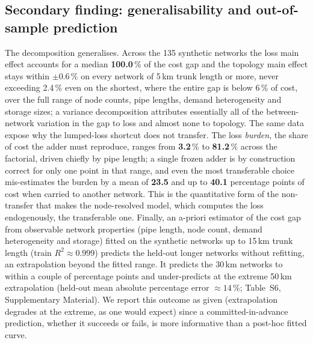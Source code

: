 \documentclass[a4paper,fleqn]{cas-sc}
\begin{document}
\subsection{Secondary finding: generalisability and out-of-sample prediction}
\label{subsec:generalis}
The decomposition generalises. Across the 135 synthetic networks the loss main effect
accounts for a median \textbf{100.0}\,\% of the cost gap and the topology main
effect stays within $\pm$0.6\,\% on every network of 5\,km trunk length or more, never exceeding 2.4\,\% even on the shortest, where the entire gap is below 6\,\% of cost, over the full range of
node counts, pipe lengths, demand heterogeneity and storage sizes; a variance decomposition
attributes essentially all of the between-network variation in the gap to loss and almost none
to topology. The same data expose why the lumped-loss shortcut does not transfer. The loss
\emph{burden}, the share of cost the adder must reproduce, ranges from
\textbf{3.2}\,\% to \textbf{81.2}\,\% across the factorial, driven
chiefly by pipe length; a single frozen adder is by construction correct for only one point in
that range, and even the most transferable choice mis-estimates the burden by a mean of
\textbf{23.5} and up to \textbf{40.1} percentage points of cost
when carried to another network. This is the quantitative form of the non-transfer that makes
the node-resolved model, which computes the loss endogenously, the transferable one. Finally,
an a-priori estimator of the cost gap from observable network properties (pipe length, node
count, demand heterogeneity and storage) fitted on the synthetic networks up to 15\,km trunk
length (train $R^2\approx0.999$) predicts the held-out longer networks without refitting, an
extrapolation beyond the fitted range. It predicts the 30\,km networks to within a couple of
percentage points and under-predicts at the extreme 50\,km extrapolation (held-out mean absolute
percentage error $\approx14$\,\%; Table~S6, Supplementary Material). We report this outcome as given
(extrapolation degrades at the extreme, as one would expect) since a committed-in-advance
prediction, whether it succeeds or fails, is more informative than a post-hoc fitted curve.
\end{document}
